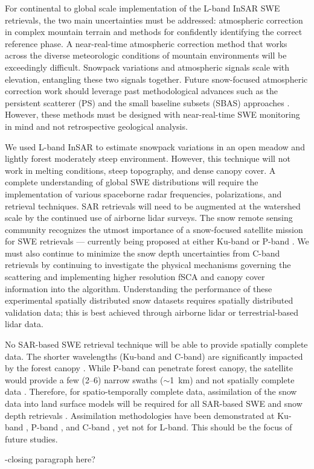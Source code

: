 For continental to global scale implementation of the L-band InSAR SWE retrievals, the two main uncertainties must be addressed: atmospheric correction in complex mountain terrain and methods for confidently identifying the correct reference phase. A near-real-time atmospheric correction method that works across the diverse meteorologic conditions of mountain environments will be exceedingly difficult. Snowpack variations and atmospheric signals scale with elevation, entangling these two signals together. Future snow-focused atmospheric correction work should leverage past methodological advances such as the persistent scatterer (PS) \citep{ferrettiPermanentScatterersSAR2001} and the small baseline subsets (SBAS) approaches \citep{berardinoNewAlgorithmSurface2002a,yunjunSmallBaselineInSAR2019a}. However, these methods must be designed with near-real-time SWE monitoring in mind and not retrospective geological analysis.

We used L-band InSAR to estimate snowpack variations in an open meadow and lightly forest moderately steep environment. However, this technique will not work in melting conditions, steep topography, and dense canopy cover. A complete understanding of global SWE distributions will require the implementation of various spaceborne radar frequencies, polarizations, and retrieval techniques. SAR retrievals will need to be augmented at the watershed scale by the continued use of airborne lidar surveys. The snow remote sensing community recognizes the utmost importance of a snow-focused satellite mission for SWE retrievals --- currently being proposed at either Ku-band \citep{tsangReviewArticleGlobal2022, garnaudQuantifyingSnowMass2019} or P-band \citep{shahRemoteSensingSnow2017}.  We must also continue to minimize the snow depth uncertainties from C-band retrievals \citep{lievensSnowDepthVariability2019,lievensSentinel1SnowDepth2022} by continuing to investigate the physical mechanisms governing the scattering and implementing higher resolution fSCA and canopy cover information into the algorithm. Understanding the performance of these experimental spatially distributed snow datasets requires spatially distributed validation data; this is best achieved through airborne lidar \citep{painterAirborneSnowObservatory2016} or terrestrial-based lidar data.

No SAR-based SWE retrieval technique will be able to provide spatially complete data. The shorter wavelengths (Ku-band and C-band) are significantly impacted by the forest canopy \citep{rottColdRegionsHydrology2010}. While P-band can penetrate forest canopy, the satellite would provide a few (2--6) narrow swaths ($\sim$1~km) and not spatially complete data \citep{yuehSatelliteSyntheticAperture2021}. Therefore, for spatio-temporally complete data, assimilation of the snow data into land surface models will be required for all SAR-based SWE and snow depth retrievals \citep{girottoDataAssimilationImproves2020}. Assimilation methodologies have been demonstrated at Ku-band \citep{wrzesienDevelopmentNatureRun2022, choEvaluatingUtilityActive2022}, P-band \citep{maEstimatingSpatiotemporallyContinuous2023}, and C-band \citep{girottoIdentifyingSnowfallElevation2023, brangersSentinel1SnowDepth2023}, yet not for L-band. This should be the focus of future studies.

-closing paragraph here?



